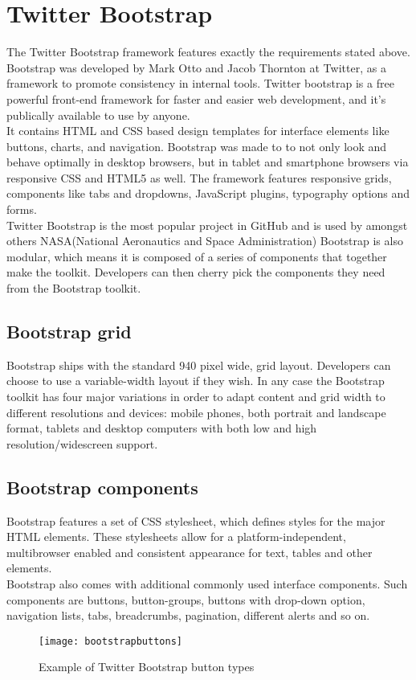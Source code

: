 \section{Twitter Bootstrap}
The Twitter Bootstrap framework\cite{twitterbootstrap} features exactly the requirements stated above. Bootstrap was developed by Mark Otto and Jacob Thornton at Twitter, as a framework to promote consistency in internal tools\cite{buildingbootstrap}. Twitter bootstrap is a free powerful front-end framework for faster and easier web development, and it's publically available to use by anyone.\\ It contains HTML and CSS based design templates for interface elements like buttons, charts, and navigation. Bootstrap was made to to not only look and behave optimally in desktop browsers, but in tablet and smartphone browsers via responsive CSS and HTML5 as well. The framework features responsive grids, components like tabs and dropdowns, JavaScript plugins, typography options and forms. \\
Twitter Bootstrap is the most popular project in GitHub and is used by amongst others NASA(National Aeronautics and Space Administration)\cite{nasa}
Bootstrap is also modular, which means it is composed of a series of components that together make the toolkit. Developers can then cherry pick the components they need from the Bootstrap toolkit. \\

\subsection{Bootstrap grid}
Bootstrap ships with the standard 940 pixel wide, grid layout. Developers can choose to use a variable-width layout if they wish. In any case the Bootstrap toolkit has four major variations in order to adapt content and grid width to different resolutions and devices: mobile phones, both portrait and landscape format, tablets and desktop computers with both low and high resolution/widescreen support.

\subsection{Bootstrap components}
Bootstrap features a set of CSS stylesheet, which defines styles for the major HTML elements. These stylesheets allow for a platform-independent, multibrowser enabled and consistent appearance for text, tables and other elements. \\
Bootstrap also comes with additional commonly used interface components. Such components are buttons, button-groups, buttons with drop-down option, navigation lists, tabs, breadcrumbs, pagination, different alerts and so on. 
\begin{figure}[h!]
\label{bootstrapbutton}
\centering
	\texttt{[image: bootstrapbuttons]}
\caption{Example of Twitter Bootstrap button types}
\end{figure}


